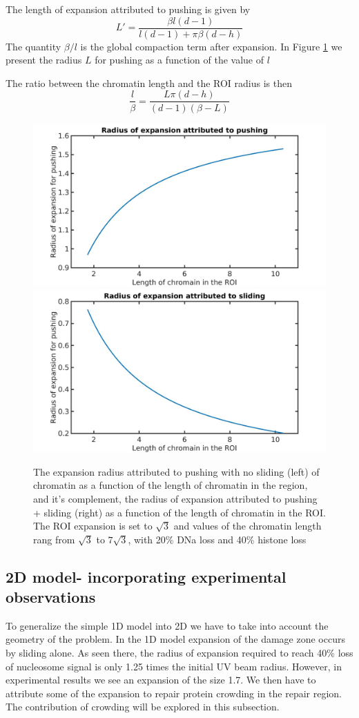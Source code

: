 \documentclass[12pt]{report}
\begin{document}
The length of expansion attributed to pushing is given by 
   \begin{equation*}
   L' = \frac{\beta l(d-1)}{l(d-1) +\pi \beta(d-h)}
   \end{equation*}
 The quantity $\beta /l$ is the global compaction term after expansion. In Figure \ref{fig:radiiVsLengthOfChromainInROI} we present the radius $L$ for pushing as a function of the value of $l$ 
 
 The ratio between the chromatin length and the ROI radius is then 
 \begin{equation*}
 \frac{l}{\beta} =\frac{L\pi(d-h)}{(d-1)(\beta-L)} 
 \end{equation*}
\begin{figure}[H]

\includegraphics[width=0.5\linewidth, height=0.3\textheight]{Images/SlidingModel/radiusOfPushingVsLengthOfChromainInROI}
\includegraphics[width=0.5\linewidth, height=0.3\textheight]{Images/SlidingModel/radiusOfSlidingVsLengthOfChromatinInROI}
\caption{\tiny{The expansion radius attributed to pushing with no sliding (left) of chromatin as a function of the length of chromatin in the region, and it's complement, the radius of expansion attributed to pushing + sliding (right) as a function of the length of chromatin in the ROI. The ROI expansion is set to $\sqrt{3}$ and values of the chromatin length rang from $\sqrt{3}$ to $7\sqrt{3}$, with 20\% DNa loss and 40\% histone loss}}
\label{fig:radiiVsLengthOfChromainInROI}
\end{figure}

\subsection{2D model- incorporating experimental observations}\label{subsection:2dModel}
To generalize the simple 1D model into 2D we have to take into account the geometry of the problem. In the 1D model expansion of the damage zone occurs by sliding alone. As seen there, the radius of expansion required to reach 40\% loss of nucleosome signal is only 1.25 times the initial UV beam radius. However, in experimental results we see an expansion of the size 1.7. We then have to attribute some of the expansion to repair protein crowding in the repair region. The contribution of crowding will be explored in this subsection. 
\end{document}
